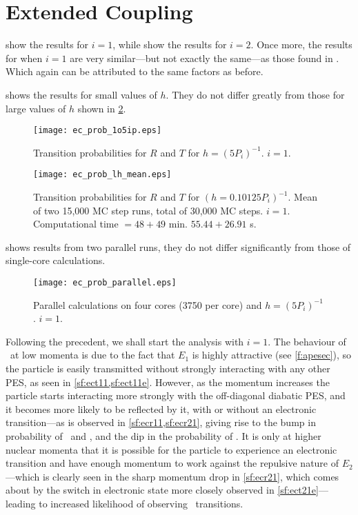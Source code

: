 \section{Extended Coupling}
%
 show the results for $ i = 1 $, while  show the results for $ i = 2 $. Once more, the results for when $ i = 1 $ are very similar---but not exactly the same---as those found in \cite{project}. Which again can be attributed to the same factors as before.

 shows the results for small values of $ h $. They do not differ greatly from those for large values of $ h $ shown in \cref{f:eclhmean}.
\begin{figure}
\centering
\texttt{[image: ec\_prob\_1o5ip.eps]}
\caption[Extended coupling: small integration step. $ i = 1 $.]{Transition probabilities for $ R $ and $ T $ for $ h = (5 P_{i})^{-1} $. $ i = 1 $.}
\label{f:ec1}
\end{figure}
\begin{figure}
\centering
\texttt{[image: ec\_prob\_lh\_mean.eps]}
\caption[Extended coupling: large integration step. $ i = 1 $.]{Transition probabilities for $ R $ and $ T $ for $ (h = 0.10125 P_{i})^{-1}$. Mean of two 15,000 MC step runs, total of 30,000 MC steps. $ i = 1 $. Computational time $ = 48 + 49$ min. $ 55.44 + 26.91 $ s.}
\label{f:eclhmean}
\end{figure}
 shows results from two parallel runs, they do not differ significantly from those of single-core calculations.
\begin{figure}
\centering
\texttt{[image: ec\_prob\_parallel.eps]}
\caption[Extended coupling: parallel calculations. $ i = 1 $.]{Parallel calculations on four cores (3750 per core) and $ h = (5 P_{i})^{-1} $. $ i = 1 $.}
\label{f:ecpar}
\end{figure}

Following the precedent, we shall start the analysis with $ i = 1 $. The behaviour of \too~at low momenta is due to the fact that $ E_{1} $ is highly attractive (see \cref{f:apesec}), so the particle is easily transmitted without strongly interacting with any other PES, as seen in \cref{sf:ect11,sf:ect11e}. However, as the momentum increases the particle starts interacting more strongly with the off-diagonal diabatic PES, and it becomes more likely to be reflected by it, with or without an electronic transition---as is observed in \cref{sf:ecr11,sf:ecr21}, giving rise to the bump in probability of \roo~and \rto, and the dip in the probability of \too. It is only at higher nuclear momenta that it is possible for the particle to experience an electronic transition and have enough momentum to work against the repulsive nature of $ E_{2} $---which is clearly seen in the sharp momentum drop in \cref{sf:ecr21}, which comes about by the switch in electronic state more closely observed in \cref{sf:ect21e}---leading to increased likelihood of observing \tto~transitions.

